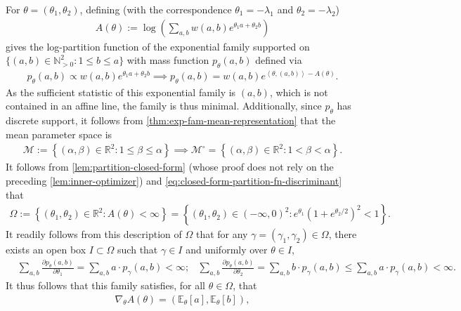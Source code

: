 \documentclass[11pt]{amsart}
\numberwithin{equation}{section}
\numberwithin{equation}{section}
\newcommand{\1}{\mathbbm{1}}
\newcommand{\R}{\mathbb{R}}
\newcommand{\E}{\mathbb{E}}
\newcommand{\N}{\mathbb{N}}
\theoremstyle{definition}
\begin{document}
\begin{appendices}
For $\theta = (\theta_1, \theta_2)$, defining (with the correspondence $\theta_1 = -\lambda_1$ and $\theta_2 = -\lambda_2$)
\begin{align*}
    A(\theta) := \log\left( \sum_{a,b} w(a,b) e^{\theta_1 a + \theta_2 b} \right)
\end{align*}
gives the log-partition function of the exponential family supported on $\{ (a,b)\in\N_{>0}^2:1\le b\le a\}$ with mass function $p_\theta(a,b)$ defined via
\begin{align*}
    p_\theta(a,b) \propto w(a,b) e^{\theta_1 a + \theta_2 b} \implies p_\theta(a,b) = w(a,b) e^{\left\langle \theta, (a,b) \right\rangle - A(\theta)}.
\end{align*}
As the sufficient statistic of this exponential family is $(a,b)$, which is not contained in an affine line, the family is thus minimal. Additionally, since $p_\theta$ has discrete support, it follows from \cref{thm:exp-fam-mean-representation} that the mean parameter space is
\begin{align*}
    \mathcal M := \left\{ (\alpha, \beta) \in \R^2: 1 \leq \beta \leq \alpha \right\} \implies \mathcal M^\circ = \left\{ (\alpha, \beta) \in \R^2: 1 < \beta < \alpha \right\}.
\end{align*}
It follows from \cref{lem:partition-closed-form} (whose proof does not rely on the preceding \cref{lem:inner-optimizer}) and \eqref{eq:closed-form-partition-fn-discriminant} that
\begin{align*}
    \Omega := \left\{ (\theta_1, \theta_2) \in \R^2 : A(\theta) < \infty \right\} = \left\{ (\theta_1, \theta_2) \in (-\infty, 0)^2 : e^{\theta_1}(1+e^{\theta_2/2})^2 < 1 \right\}.
\end{align*}
It readily follows from this description of $\Omega$ that for any $\gamma = (\gamma_1, \gamma_2) \in \Omega$, there exists an open box $I \subset \Omega$ such that $\gamma \in I$ and uniformly over $\theta \in I$, 
\begin{align*}
    & \sum_{a,b} \frac{\partial p_\theta(a,b)}{\partial \theta_1} = \sum_{a,b} a \cdot p_\gamma(a,b) < \infty;
    & \sum_{a,b} \frac{\partial p_\theta(a,b)}{\partial \theta_2} = \sum_{a,b} b \cdot p_\gamma(a,b) \leq \sum_{a,b} a \cdot p_\gamma(a,b) < \infty.
\end{align*}
It thus follows that this family satisfies, for all $\theta \in \Omega$, that
\begin{align} \label{eq:exp_fam_opt_existence}
    \nabla_\theta A(\theta) = \left( \E_\theta[a], \E_\theta[b] \right),
\end{align}

\end{appendices}
\end{document}
